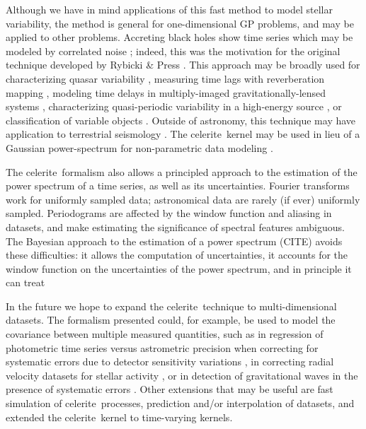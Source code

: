 \documentclass[manuscript, letterpaper]{aastex6}
\newcommand{\project}[1]{\textsf{#1}}
\newcommand{\celerite}{\project{celerite}}
\begin{document}
Although we have in mind applications of this fast method to model stellar
variability, the method is general for one-dimensional GP problems, and may be
applied to other problems.
Accreting black holes show time series which may be modeled by correlated
noise \citep{Kelly:2014};  indeed, this was the motivation for the original
technique developed by Rybicki \& Press \citep{Rybicki:1992,Rybicki:1995}.
This approach may be broadly used for characterizing quasar variability
\citep{MacLeod:2010}, measuring time lags with reverberation mapping
\citep{Zu:2011,Pancoast:2014}, modeling time delays in multiply-imaged
gravitationally-lensed systems \citep{Press:1998}, characterizing quasi-periodic
variability in a high-energy source \citep{McAllister:2016}, or
classification of variable objects \citep{Zinn:2016}.
Outside of astronomy, this technique may have application to terrestrial
seismology \citep{Robinson:1967}.
The \celerite\ kernel may be used in lieu of a Gaussian power-spectrum for
non-parametric data modeling \citep{Wilson:2013}.

The \celerite\ formalism also allows a principled approach to the estimation
of the power spectrum of a time series, as well as its uncertainties.
Fourier transforms work for uniformly sampled data;  astronomical data are
rarely (if ever) uniformly sampled.  Periodograms are affected by the window
function and aliasing in datasets, and make estimating the significance of
spectral features ambiguous.  The Bayesian approach to the estimation of a power
spectrum (CITE) avoids these difficulties:  it allows the computation of
uncertainties, it accounts for the window function on the uncertainties of
the power spectrum, and in principle it can treat 

In the future we hope to expand the \celerite\ technique to multi-dimensional
datasets.  The formalism presented could, for example, be used to model
the covariance between multiple measured quantities, such as in regression of photometric
time series versus astrometric precision when correcting for systematic errors
due to detector sensitivity variations \citep{Aigrain:2016}, in correcting
radial velocity datasets for stellar activity \citep{Haywood:2014,Rajpaul:2015},
or in detection of gravitational waves in the presence of systematic errors
\citep{Moore:2016}.  Other extensions that may be useful are fast simulation
of \celerite\ processes, prediction and/or interpolation of datasets, and
extended the \celerite\ kernel to time-varying kernels.
\end{document}
